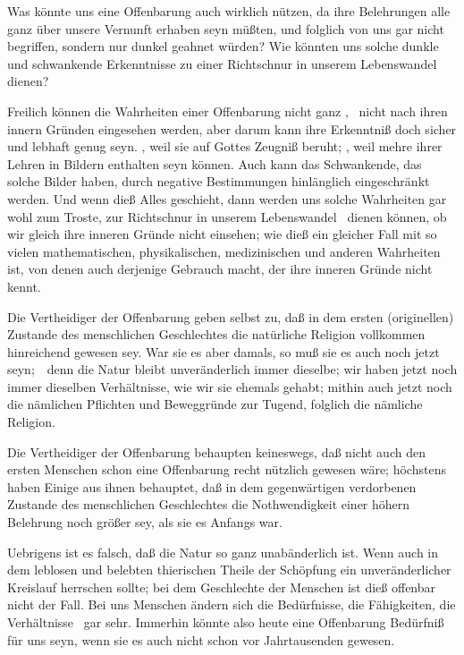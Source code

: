 Was könnte uns eine Offenbarung auch wirklich nützen, da ihre Belehrungen alle ganz über unsere Vernunft erhaben seyn müßten, und folglich von uns gar nicht begriffen, sondern nur dunkel geahnet würden? Wie könnten uns solche dunkle und schwankende Erkenntnisse zu einer Richtschnur in unserem Lebenswandel dienen?\par
{} Freilich können die Wahrheiten einer Offenbarung nicht ganz , \dh\ nicht nach ihren innern Gründen eingesehen werden, aber darum kann ihre Erkenntniß doch sicher und lebhaft genug seyn. , weil sie auf Gottes Zeugniß beruht; , weil mehre ihrer Lehren in Bildern enthalten seyn können. Auch kann das Schwankende, das solche Bilder haben, durch negative Bestimmungen hinlänglich eingeschränkt werden. Und wenn dieß Alles geschieht, dann werden uns solche Wahrheiten gar wohl zum Troste, zur Richtschnur in unserem Lebenswandel \usw\ dienen können, ob wir gleich ihre inneren Gründe nicht einsehen; wie dieß ein gleicher Fall mit so vielen mathematischen, physikalischen, medizinischen und anderen Wahrheiten ist, von denen auch derjenige Gebrauch macht, der ihre inneren Gründe nicht kennt.

Die Vertheidiger der Offenbarung geben selbst zu, daß in dem ersten (originellen) Zustande des menschlichen Geschlechtes die natürliche Religion vollkommen hinreichend gewesen sey. War sie es aber damals, so muß sie es auch noch jetzt seyn;~\ denn die Natur bleibt unveränderlich immer dieselbe; wir haben jetzt noch immer dieselben Verhältnisse, wie wir sie ehemals gehabt; mithin auch jetzt noch die nämlichen Pflichten und Beweggründe zur Tugend, folglich die nämliche Religion.\par
{} 
\begin{aufza}
\item Die Vertheidiger der Offenbarung behaupten keineswegs, daß nicht auch den ersten Menschen schon eine Offenbarung recht nützlich gewesen wäre; höchstens haben Einige aus ihnen behauptet, daß in dem gegenwärtigen verdorbenen Zustande des menschlichen Geschlechtes die Nothwendigkeit einer höhern Belehrung noch größer sey, als sie es Anfangs war.
\item Uebrigens ist es falsch, daß die Natur so ganz unabänderlich ist. Wenn auch in dem leblosen und belebten thierischen Theile der Schöpfung ein unveränderlicher Kreislauf herrschen sollte; bei dem Geschlechte der Menschen ist dieß offenbar nicht der Fall. Bei uns Menschen ändern sich die Bedürfnisse, die Fähigkeiten, die Verhältnisse \usw\ gar sehr. Immerhin könnte also heute eine Offenbarung Bedürfniß für uns seyn, wenn sie es auch nicht schon vor Jahrtausenden gewesen.
\end{aufza}

